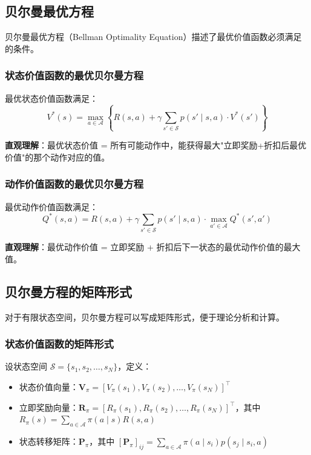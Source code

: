 \subsection{贝尔曼最优方程}

贝尔曼最优方程（Bellman Optimality Equation）描述了最优价值函数必须满足的条件。

\subsubsection{状态价值函数的最优贝尔曼方程}
\begin{theorem}[状态价值函数的最优贝尔曼方程]
最优状态价值函数满足：
\[
V^*(s) = \max_{a \in \mathcal{A}} \left\{ R(s, a) + \gamma \sum_{s' \in \mathcal{S}} p(s' \mid s, a) \cdot V^*(s') \right\}
\]
\end{theorem}

\textbf{直观理解}：最优状态价值 = 所有可能动作中，能获得最大"立即奖励+折扣后最优价值"的那个动作对应的值。

\subsubsection{动作价值函数的最优贝尔曼方程}
\begin{theorem}[动作价值函数的最优贝尔曼方程]
最优动作价值函数满足：
\[
Q^*(s, a) = R(s, a) + \gamma \sum_{s' \in \mathcal{S}} p(s' \mid s, a) \cdot \max_{a' \in \mathcal{A}} Q^*(s', a')
\]
\end{theorem}

\textbf{直观理解}：最优动作价值 = 立即奖励 + 折扣后下一状态的最优动作价值的最大值。

\subsection{贝尔曼方程的矩阵形式}

对于有限状态空间，贝尔曼方程可以写成矩阵形式，便于理论分析和计算。

\subsubsection{状态价值函数的矩阵形式}
设状态空间 $\mathcal{S} = \{s_1, s_2, \ldots, s_N\}$，定义：
\begin{itemize}
    \item 状态价值向量：$\mathbf{V}_\pi = [V_\pi(s_1), V_\pi(s_2), \ldots, V_\pi(s_N)]^\top$
    \item 立即奖励向量：$\mathbf{R}_\pi = [R_\pi(s_1), R_\pi(s_2), \ldots, R_\pi(s_N)]^\top$，其中 $R_\pi(s) = \sum_{a \in \mathcal{A}} \pi(a \mid s) R(s, a)$
    \item 状态转移矩阵：$\mathbf{P}_\pi$，其中 $[\mathbf{P}_\pi]_{ij} = \sum_{a \in \mathcal{A}} \pi(a \mid s_i) p(s_j \mid s_i, a)$
\end{itemize}

